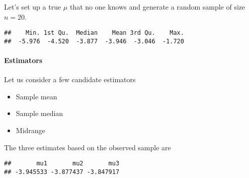 Let's set up a true $\mu$ that no one knows and generate a random sample of size
$n = 20$.
\begin{knitrout}
\color{fgcolor}\begin{kframe}
\begin{alltt}
\hlstd{(}\hlstd{)} 
 \hlkwb{<-} \hlstd{(}\hlstd{,}  \hlstd{=}\hlopt{-} \hlstd{,}  \hlstd{=} \hlstd{)}
 \hlkwb{<-} 
 \hlkwb{<-}     \hlstd{=} \hlstd{)}
\end{alltt}
\begin{verbatim}
##    Min. 1st Qu.  Median    Mean 3rd Qu.    Max. 
##  -5.976  -4.520  -3.877  -3.946  -3.046  -1.720
\end{verbatim}
\end{kframe}
\end{knitrout}


\paragraph{Estimators}

Let us consider a few candidate estimators

\begin{itemize}
\item Sample mean
\item Sample median
\item Midrange
\end{itemize}

The three estimates based on the observed sample are
\begin{knitrout}
\color{fgcolor}\begin{kframe}
\begin{alltt}
 \hlkwb{<-} \hlstd{(} \hlstd{=}   \hlstd{=}   \hlstd{=} \hlstd{(}
\end{alltt}
\begin{verbatim}
##       mu1       mu2       mu3 
## -3.945533 -3.877437 -3.847917
\end{verbatim}
\end{kframe}
\end{knitrout}


